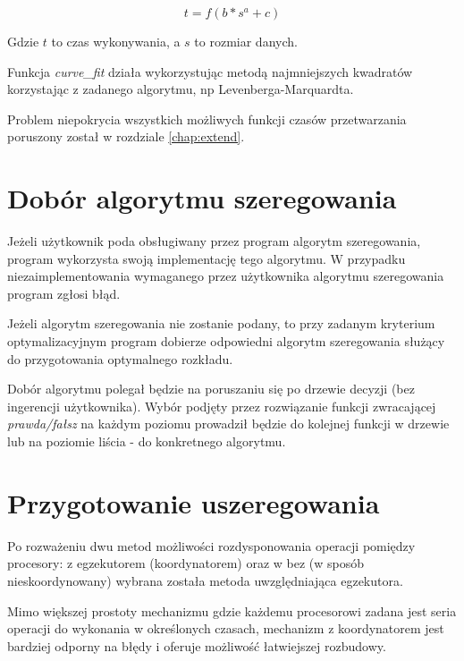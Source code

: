\documentclass[brudnopis]{xmgr}
\begin{document}
$$t = f(b * s^a + c)$$

Gdzie $t$ to czas wykonywania, a $s$ to rozmiar danych.

Funkcja \emph{curve\_fit} działa wykorzystując metodą najmniejszych kwadratów korzystając z zadanego algorytmu, np Levenberga-Marquardta.

Problem niepokrycia wszystkich możliwych funkcji czasów przetwarzania poruszony został w rozdziale \ref{chap:extend}.


\section{Dobór algorytmu szeregowania}


Jeżeli użytkownik poda obsługiwany przez program algorytm szeregowania, program wykorzysta swoją implementację tego algorytmu.
W przypadku niezaimplementowania wymaganego przez użytkownika algorytmu szeregowania program zgłosi błąd.

Jeżeli algorytm szeregowania nie zostanie podany, to przy zadanym kryterium optymalizacyjnym program dobierze odpowiedni algorytm szeregowania służący do przygotowania optymalnego rozkładu.

Dobór algorytmu polegał będzie na poruszaniu się po drzewie decyzji (bez ingerencji użytkownika).
Wybór podjęty przez rozwiązanie funkcji zwracającej \emph{prawda/fałsz} na każdym poziomu prowadził będzie do kolejnej funkcji w drzewie lub na poziomie liścia - do konkretnego algorytmu.

\section{Przygotowanie uszeregowania}

Po rozważeniu dwu metod możliwości rozdysponowania operacji pomiędzy procesory: z egzekutorem (koordynatorem) oraz w bez (w sposób nieskoordynowany) wybrana została metoda uwzględniająca egzekutora.

Mimo większej prostoty mechanizmu gdzie każdemu procesorowi zadana jest seria operacji do wykonania w określonych czasach, mechanizm z koordynatorem jest bardziej odporny na błędy i oferuje możliwość łatwiejszej rozbudowy.
\end{document}
